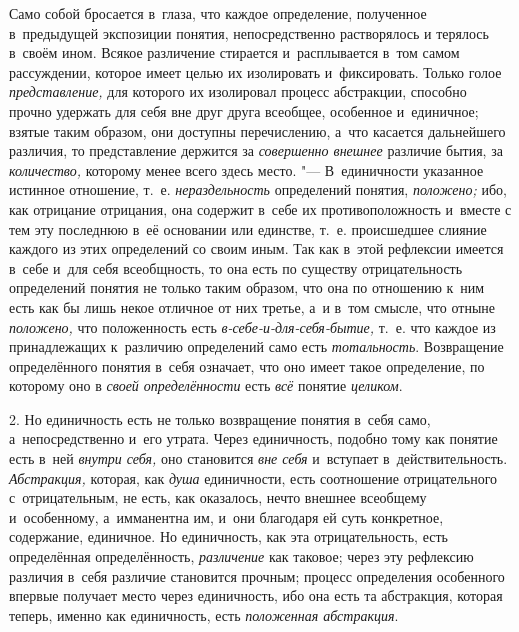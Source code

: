 Само собой бросается в~глаза, что каждое определение,
полученное в~предыдущей экспозиции понятия, непосредственно растворялось и
терялось в~своём ином. Всякое различение стирается и~расплывается в~том
самом рассуждении, которое имеет целью их изолировать и~фиксировать. Только
голое {\em представление,}
для которого их изолировал процесс абстракции, способно
прочно удержать для себя вне друг друга всеобщее, особенное и~единичное;
взятые таким образом, они доступны перечислению, а~что касается дальнейшего
различия, то представление держится за {\em совершенно внешнее}
различие бытия, за {\em количество,} которому менее всего здесь
место. "--- В~единичности указанное истинное отношение, т.~е.
{\em нераздельность} определений понятия, {\em положено;} ибо, как
отрицание отрицания, она содержит в~себе их противоположность и~вместе с
тем эту последнюю в~её основании или единстве, т.~е. происшедшее слияние
каждого из этих определений со своим иным. Так как в~этой рефлексии
имеется в~себе и~для себя всеобщность, то она есть по существу
отрицательность определений понятия не только таким образом, что она по
отношению к~ним есть как бы лишь некое отличное от них третье, а~и в~том
смысле, что отныне {\em положено,} что положенность есть
{\em в-себе-и-для-себя-бытие,} т.~е. что каждое из принадлежащих к~различию
определений само есть {\em тотальность}. Возвращение определённого понятия
в~себя означает, что оно имеет такое определение, по которому оно в
{\em своей определённости} есть {\em всё} понятие {\em целиком}.

2. Но единичность есть не только возвращение понятия в~себя
само, а~непосредственно и~его утрата. Через единичность, подобно тому как
понятие есть в~ней {\em внутри себя,} оно
становится {\em вне себя} и~вступает в~действительность.
{\em Абстракция,} которая, как {\em душа}
единичности, есть соотношение отрицательного с~отрицательным,
не есть, как оказалось, нечто внешнее всеобщему и~особенному, а~имманентна
им, и~они благодаря ей суть конкретное, содержание, единичное. Но
единичность, как эта отрицательность, есть определённая определённость,
{\em различение} как таковое; через эту рефлексию различия в~себя различие
становится прочным; процесс определения особенного впервые получает место через
единичность, ибо она есть та абстракция, которая теперь, именно как
единичность, есть {\em положенная абстракция}.


